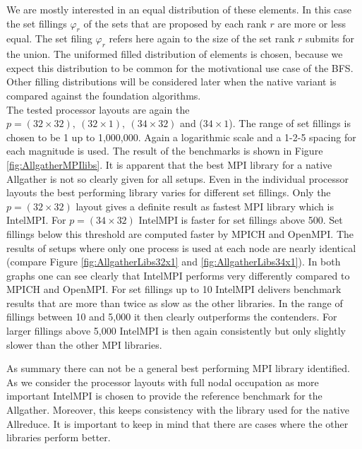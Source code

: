 We are mostly interested in an equal distribution of these elements. In this case the set fillings $\varphi_r$ of the sets that are proposed by each rank $r$ are more or less equal. The set filing $\varphi_r$ refers here again to the size of the set rank $r$ submits for the union.  The uniformed filled distribution of elements is chosen, because we expect this distribution to be common for the motivational use case of the BFS. Other filling distributions will be considered later when the native variant is compared against the foundation algorithms.\\
The tested processor layouts are again the $p=(32\times32),~(32\times1),~(34\times32)$ and ($34\times1$). The range of set fillings is chosen to be 1 up to 1,000,000. Again a logarithmic scale and a 1-2-5 spacing for each magnitude is used. The result of the benchmarks is shown in Figure \ref{fig:AllgatherMPIlibs}.
It is apparent that the best MPI library for a native Allgather is not so clearly given for all setups. Even in the individual processor layouts the best performing library varies for different set fillings. Only the $p=(32\times32)$ layout gives a definite result as fastest MPI library which is IntelMPI. For $p=(34\times32)$ IntelMPI is faster for set fillings above 500. Set fillings below this threshold are computed faster by MPICH and OpenMPI. The results of setups where only one process is used at each node are nearly identical (compare Figure \ref{fig:AllgatherLibs32x1} and \ref{fig:AllgatherLibs34x1}). In both graphs one can see clearly that IntelMPI performs very differently compared to MPICH and OpenMPI. For set fillings up to 10 IntelMPI delivers benchmark results that are more than twice as slow as the other libraries. In the range of fillings between 10 and 5,000 it then clearly outperforms the contenders. For larger fillings above 5,000 IntelMPI is then again consistently but only slightly slower than the other MPI libraries.

As summary there can not be a general best performing MPI library identified. As we consider the processor layouts with full nodal occupation as more important  IntelMPI is chosen to provide the reference benchmark for the Allgather. Moreover, this keeps consistency with the library used for the native Allreduce. It is important to keep in mind that there are cases where the other libraries perform better.

